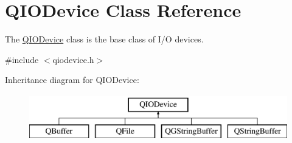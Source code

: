 \hypertarget{class_q_i_o_device}{}\section{Q\+I\+O\+Device Class Reference}
\label{class_q_i_o_device}


The \mbox{\hyperlink{class_q_i_o_device}{Q\+I\+O\+Device}} class is the base class of I/O devices.  




{\ttfamily \#include $<$qiodevice.\+h$>$}

Inheritance diagram for Q\+I\+O\+Device\+:\begin{figure}[H]
\begin{center}
\leavevmode
\includegraphics[height=2.000000cm]{class_q_i_o_device}
\end{center}
\end{figure}
